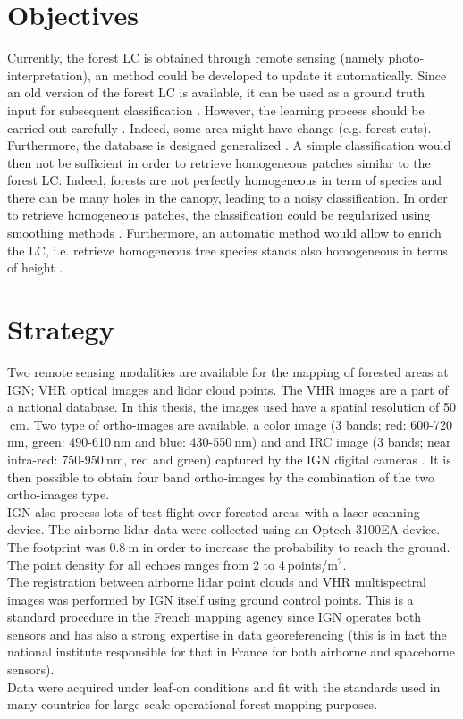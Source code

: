 \section{Objectives}
Currently, the forest LC is obtained through remote sensing (namely photo-inter\-pretation), an method could be developed to update it automatically. Since an old version of the forest LC is available, it can be used as a ground truth input for subsequent classification \citep{gressin2013updating}. However, the learning process should be carried out carefully \citep{gressin2014updating}. Indeed, some area might have change (e.g. forest cuts). Furthermore, the database is designed generalized \citep{smith1977database}. A simple classification would then not be sufficient in order to retrieve homogeneous patches similar to the forest LC. Indeed, forests are not perfectly homogeneous in term of species and there can be many holes in the canopy, leading to a noisy classification. In order to retrieve homogeneous patches, the classification could be regularized using smoothing methods \citep{schindler2012overview}. Furthermore, an automatic method would allow to enrich the LC, i.e. retrieve homogeneous tree species stands also homogeneous in terms of height \citep{gressin2014unified}.

\section{Strategy}
Two remote sensing modalities are available for the mapping of forested areas at IGN; VHR optical images and lidar cloud points. The VHR images are a part of a national database. In this thesis, the images used have a spatial resolution of 50$\:$cm. Two type of ortho-images are available, a color image (3 bands; red: 600-720$\:$nm, green: 490-610$\:$nm and blue: 430-550$\:$nm) and and IRC image (3 bands; near infra-red: 750-950$\:$nm, red and green) captured by the IGN digital cameras \citep{souchon2012large}. It is then possible to obtain four band ortho-images by the combination of the two ortho-images type. \\
IGN also process lots of test flight over forested areas with a laser scanning device. The airborne lidar data were collected using an Optech 3100EA device. The footprint was 0.8$\:$m in order to increase the probability to reach the ground. The point density {for all echoes} ranges from 2 to 4$\:$points/m$^{2}$. \\

The registration between airborne lidar point clouds and VHR multispectral images was performed by IGN itself using ground control points. This is a standard procedure in the French mapping agency since IGN operates both sensors and has also a strong expertise in data georeferencing (this is in fact the national institute responsible for that in France for both airborne and spaceborne sensors). \\
Data were acquired under leaf-on conditions and fit with the standards used in many countries for large-scale operational forest mapping purposes. \\

